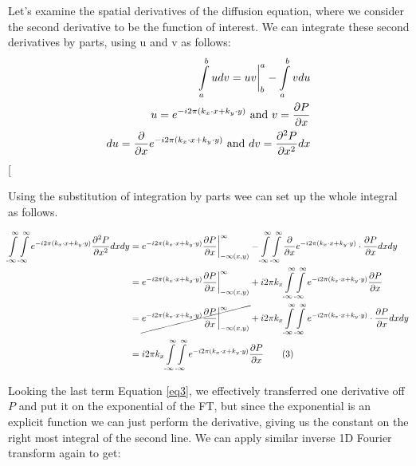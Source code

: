 Let’s examine the spatial derivatives of the diffusion equation, where we consider the second derivative to be the function of interest. We can integrate these second derivatives by parts, using u and v as  follows:
    \begin{align*}  
\int\limits_{a}^{b} udv = uv \bigg \vert^{a}_{b} - \int\limits_{a}^{b} vdu \\
u = e^{-i 2\pi (k_x \cdot x + k_y \cdot y )} \textnormal{ and } v= \frac{\partial P}{\partial x} \\
du= \frac{\partial}{\partial x} e^{-i 2\pi (k_x \cdot x + k_y \cdot y )} \textnormal{ and } dv =  \frac{\partial^2 P}{\partial x^2} dx
\label{ibp}  
\end{align*}  
\twocolumn[\begin{@twocolumnfalse}

Using the substitution of integration by parts wee can set up the whole integral as follows.

\begin{align}  
\int\limits^{\infty}_{\text{-}\infty}\int\limits^{\infty}_{\text{-}\infty} e^{-i 2\pi (k_x \cdot x + k_y \cdot y )} \frac{\partial^2 P}{\partial x^2} dx dy &= e^{-i 2\pi (k_x \cdot x + k_y \cdot y )} \frac{\partial P}{\partial x} \bigg \vert^{\infty}_{-\infty(x,y)} - \int\limits^{\infty}_{\text{-}\infty}\int\limits^{\infty}_{\text{-}\infty} \frac{\partial }{\partial x} e^{-i 2\pi (k_x \cdot x + k_y \cdot y )} \cdot \frac{\partial P}{\partial x} dx dy\\
& = e^{-i 2\pi (k_x \cdot x + k_y \cdot y )} \frac{\partial P}{\partial x} \bigg \vert^{\infty}_{-\infty(x,y)} + i 2\pi k_x \int\limits^{\infty}_{\text{-}\infty}\int\limits^{\infty}_{\text{-}\infty} e^{-i 2\pi (k_x \cdot x + k_y \cdot y )} \frac{\partial P}{\partial x} \\
& = \cancel{e^{-i 2\pi (k_x \cdot x + k_y \cdot y )} \frac{\partial P}{\partial x} \bigg \vert^{\infty}_{-\infty(x,y)}} + i 2\pi k_x \int\limits^{\infty}_{\text{-}\infty}\int\limits^{\infty}_{\text{-}\infty} e^{-i 2\pi (k_x \cdot x + k_y \cdot y )} \cdot \frac{\partial P}{\partial x} dx dy\\
& = i 2\pi k_x \int\limits^{\infty}_{\text{-}\infty}\int\limits^{\infty}_{\text{-}\infty} e^{-i 2\pi (k_x \cdot x + k_y \cdot y )} \frac{\partial P}{\partial x} \tag{3}
\label{eq3}  
\end{align}  

Looking the last term Equation \eqref{eq3}, we effectively transferred one derivative off $P$ and put it on the exponential of the FT, but since the exponential is an explicit function we can just perform the derivative, giving us the constant on the right most integral of the second line. We can apply similar inverse 1D Fourier transform again to get:


\end{@twocolumnfalse}
